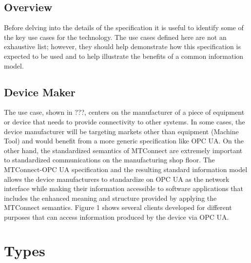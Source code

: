 \documentclass{mtconnect}	%
\begin{document}
\subsection{Overview}

Before delving into the details of the specification it is useful to identify some of the key use cases for the technology. The use cases defined here are not an exhaustive list; however, they should help demonstrate how this specification is expected to be used and to help illustrate the benefits of a common information model.

\subsection{Device Maker}

The use case, shown in ???, centers on the manufacturer of a piece of equipment or device that needs to provide connectivity to other systems. In some cases, the device manufacturer will be targeting markets other than equipment (Machine Tool) and would benefit from a more generic specification like OPC UA. On the other hand, the standardized semantics of MTConnect are extremely important to standardized communications on the manufacturing shop floor. The MTConnect-OPC UA specification and the resulting standard information model allows the device manufacturers to standardize on OPC UA as the network interface while making their information accessible to software applications that includes the enhanced meaning and structure provided by applying the MTConnect semantics. Figure 1 shows several clients developed for different purposes that can access information produced by the device via OPC UA.

\clearpage
\section{Types}\label{types}
\FloatBarrier


\end{document}
